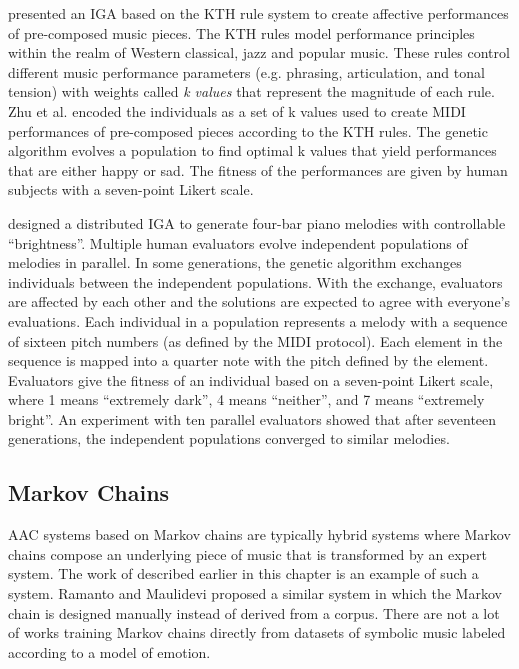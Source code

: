 \citet{zhu2008emotional} presented an IGA based on the KTH rule system \cite{friberg2006overview} to create affective performances of pre-composed music pieces. The KTH rules model performance principles within the realm of Western classical, jazz and popular music. These rules control different music performance parameters (e.g. phrasing, articulation, and tonal tension) with weights called \textit{k values} that represent the magnitude of each rule. Zhu et al. \cite{zhu2008emotional} encoded the individuals as a set of k values used to create MIDI performances of pre-composed pieces according to the KTH rules. The genetic algorithm evolves a population to find optimal k values that yield performances that are either happy or sad. The fitness of the performances are given by human subjects with a seven-point Likert scale.

\citet{nomura2018music} designed a distributed IGA to generate four-bar piano melodies with controllable ``brightness''. Multiple human evaluators evolve independent populations of melodies in parallel. In some generations, the genetic algorithm exchanges individuals between the independent populations. With the exchange, evaluators are affected by each other and the solutions are expected to agree with everyone's evaluations. Each individual in a population represents a melody with a sequence of sixteen pitch numbers (as defined by the MIDI protocol). Each element in the sequence is mapped into a quarter note with the pitch defined by the element. Evaluators give the fitness of an individual based on a seven-point Likert scale, where 1 means ``extremely dark'', 4 means ``neither'', and 7 means ``extremely bright''. An experiment with ten parallel evaluators showed that after seventeen generations, the independent populations converged to similar melodies.

\subsection{Markov Chains}

AAC systems based on Markov chains are typically hybrid systems where Markov chains compose an underlying piece of music that is transformed by an expert system. The work of \citet{williams2015dynamic} described earlier in this chapter is an example of such a system. Ramanto and Maulidevi \cite{ramanto2017markov} proposed a similar system in which the Markov chain is designed manually instead of derived from a corpus. There are not a lot of works training Markov chains directly from datasets of symbolic music labeled according to a model of emotion.

